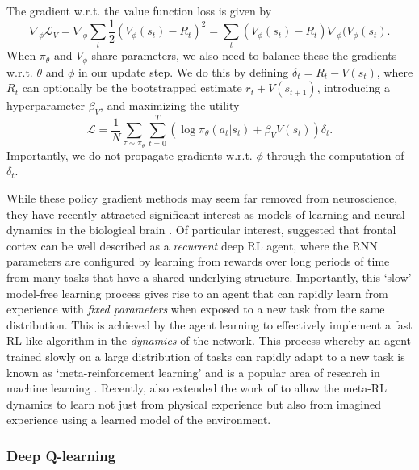 The gradient w.r.t. the value function loss is given by
\begin{equation}
    \nabla_\phi \mathcal{L}_V = \nabla_\phi \sum_t \frac12  (V_\phi(s_t) - R_t)^2 = \sum_t (V_\phi(s_t) - R_t) \nabla_\phi (V_\phi(s_t).
\end{equation}
When $\pi_\theta$ and $V_\phi$ share parameters, we also need to balance these the gradients w.r.t. $\theta$ and $\phi$ in our update step.
We do this by defining $\delta_t = R_t - V(s_t)$, where $R_t$ can optionally be the bootstrapped estimate $r_t + V(s_{t+1})$, introducing a hyperparameter $\beta_V$, and maximizing the utility
\begin{equation}
    \mathcal{L} = \frac{1}{N} \sum_{\tau \sim \pi_\theta} \sum_{t=0}^T ( \log \pi_\theta (a_t|s_t) + \beta_V V(s_t) ) \delta_t .
\end{equation}
Importantly, we do not propagate gradients w.r.t. $\phi$ through the computation of $\delta_t$.

While these policy gradient methods may seem far removed from neuroscience, they have recently attracted significant interest as models of learning and neural dynamics in the biological brain \citep{wang2018prefrontal, jensen2023recurrent, merel2019deep}.
Of particular interest, \citet{wang2018prefrontal} suggested that frontal cortex can be well described as a \emph{recurrent} deep RL agent, where the RNN parameters are configured by learning from rewards over long periods of time from many tasks that have a shared underlying structure.
Importantly, this `slow' model-free learning process gives rise to an agent that can rapidly learn from experience with \emph{fixed parameters} when exposed to a new task from the same distribution.
This is achieved by the agent learning to effectively implement a fast RL-like algorithm in the \emph{dynamics} of the network.
This process whereby an agent trained slowly on a large distribution of tasks can rapidly adapt to a new task is known as `meta-reinforcement learning' and is a popular area of research in machine learning \citep{finn2017model, ritter2018been, duan2016rl, wang2016learning}.
Recently, \citet{jensen2023recurrent} also extended the work of \citet{wang2018prefrontal} to allow the meta-RL dynamics to learn not just from physical experience but also from imagined experience using a learned model of the environment.

\subsubsection*{Deep Q-learning}

